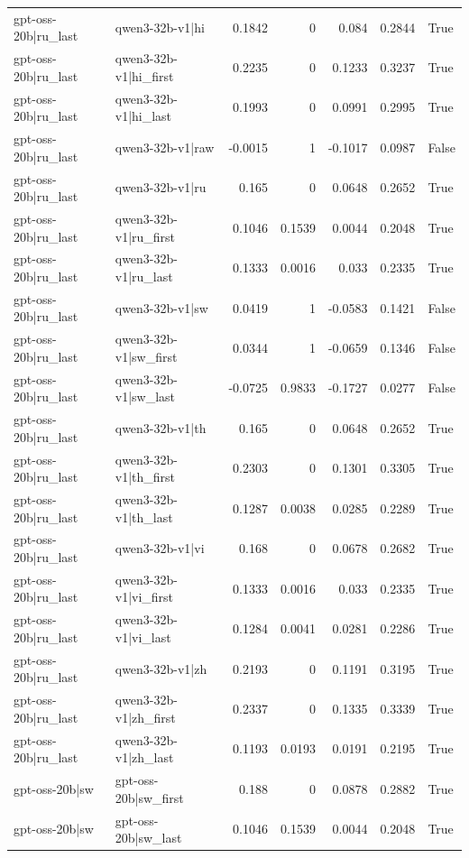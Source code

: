 \begin{table}
\begin{tabular}{l l r r r r l}
gpt-oss-20b|ru_last & qwen3-32b-v1|hi & 0.1842 & 0 & 0.084 & 0.2844 & True \\
gpt-oss-20b|ru_last & qwen3-32b-v1|hi_first & 0.2235 & 0 & 0.1233 & 0.3237 & True \\
gpt-oss-20b|ru_last & qwen3-32b-v1|hi_last & 0.1993 & 0 & 0.0991 & 0.2995 & True \\
gpt-oss-20b|ru_last & qwen3-32b-v1|raw & -0.0015 & 1 & -0.1017 & 0.0987 & False \\
gpt-oss-20b|ru_last & qwen3-32b-v1|ru & 0.165 & 0 & 0.0648 & 0.2652 & True \\
gpt-oss-20b|ru_last & qwen3-32b-v1|ru_first & 0.1046 & 0.1539 & 0.0044 & 0.2048 & True \\
gpt-oss-20b|ru_last & qwen3-32b-v1|ru_last & 0.1333 & 0.0016 & 0.033 & 0.2335 & True \\
gpt-oss-20b|ru_last & qwen3-32b-v1|sw & 0.0419 & 1 & -0.0583 & 0.1421 & False \\
gpt-oss-20b|ru_last & qwen3-32b-v1|sw_first & 0.0344 & 1 & -0.0659 & 0.1346 & False \\
gpt-oss-20b|ru_last & qwen3-32b-v1|sw_last & -0.0725 & 0.9833 & -0.1727 & 0.0277 & False \\
gpt-oss-20b|ru_last & qwen3-32b-v1|th & 0.165 & 0 & 0.0648 & 0.2652 & True \\
gpt-oss-20b|ru_last & qwen3-32b-v1|th_first & 0.2303 & 0 & 0.1301 & 0.3305 & True \\
gpt-oss-20b|ru_last & qwen3-32b-v1|th_last & 0.1287 & 0.0038 & 0.0285 & 0.2289 & True \\
gpt-oss-20b|ru_last & qwen3-32b-v1|vi & 0.168 & 0 & 0.0678 & 0.2682 & True \\
gpt-oss-20b|ru_last & qwen3-32b-v1|vi_first & 0.1333 & 0.0016 & 0.033 & 0.2335 & True \\
gpt-oss-20b|ru_last & qwen3-32b-v1|vi_last & 0.1284 & 0.0041 & 0.0281 & 0.2286 & True \\
gpt-oss-20b|ru_last & qwen3-32b-v1|zh & 0.2193 & 0 & 0.1191 & 0.3195 & True \\
gpt-oss-20b|ru_last & qwen3-32b-v1|zh_first & 0.2337 & 0 & 0.1335 & 0.3339 & True \\
gpt-oss-20b|ru_last & qwen3-32b-v1|zh_last & 0.1193 & 0.0193 & 0.0191 & 0.2195 & True \\
gpt-oss-20b|sw & gpt-oss-20b|sw_first & 0.188 & 0 & 0.0878 & 0.2882 & True \\
gpt-oss-20b|sw & gpt-oss-20b|sw_last & 0.1046 & 0.1539 & 0.0044 & 0.2048 & True \\

\end{tabular}
\end{table}
